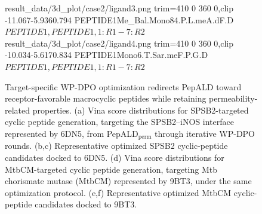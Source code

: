 \begin{figure}[!t]
{result_data/3d_plot/case2/ligand3.png}
{trim=410 0 360 0,clip}
{-11.067}{-5.936}{0.794}
{PEPTIDE1{Me_Bal.Mono84.P.L.meA.dF.D}}
{$PEPTIDE1,PEPTIDE1,1:R1-7:R2$$$}\hfill
{}
{result_data/3d_plot/case2/ligand4.png}
{trim=410 0 360 0,clip}
{-10.034}{-5.617}{0.834}
{PEPTIDE1{Mono6.T.Sar.meF.P.G.D}}
{$PEPTIDE1,PEPTIDE1,1:R1-7:R2$$$}
\caption{Target-specific WP-DPO optimization redirects PepALD toward receptor-favorable macrocyclic peptides while retaining permeability-related properties.
(a) Vina score distributions for SPSB2-targeted cyclic peptide generation, targeting the SPSB2--iNOS interface represented by 6DN5, from PepALD$_{\mathrm{perm}}$ through iterative WP-DPO rounds.
(b,c) Representative optimized SPSB2 cyclic-peptide candidates docked to 6DN5.
(d) Vina score distributions for MtbCM-targeted cyclic peptide generation, targeting Mtb chorismate mutase (MtbCM) represented by 9BT3, under the same optimization protocol.
(e,f) Representative optimized MtbCM cyclic-peptide candidates docked to 9BT3.}
\label{fig:specific_task_optimization}
\endgroup
\end{figure}
